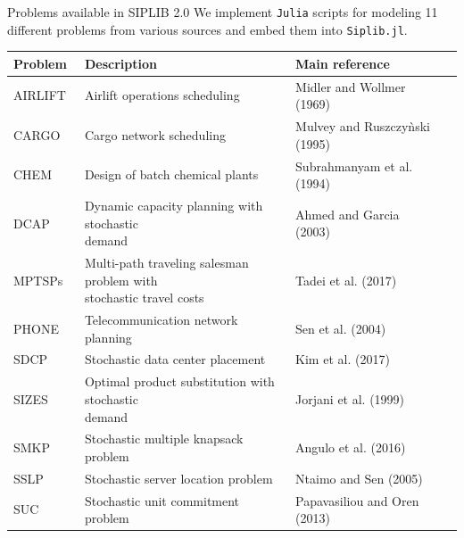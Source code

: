 \documentclass{beamer}
\def\ttiny{\fontsize{6pt}{6pt}\selectfont}
\newcommand{\siplibtwo}{\textsf{SIPLIB 2.0}}
\newcommand{\airlift}{\textsf{AIRLIFT}}
\newcommand{\chem}{\textsf{CHEM}}
\newcommand{\dcap}{\textsf{DCAP}}
\newcommand{\sdcp}{\textsf{SDCP}}
\newcommand{\mptsps}{\textsf{MPTSPs}}
\newcommand{\sizes}{\textsf{SIZES}}
\newcommand{\smkp}{\textsf{SMKP}}
\newcommand{\sslp}{\textsf{SSLP}}
\newcommand{\suc}{\textsf{SUC}}
\newcommand{\cargo}{\textsf{CARGO}}
\newcommand{\phone}{\textsf{PHONE}}
\newcommand{\siplibjl}{\texttt{Siplib.jl}}
\begin{document}
	\begin{frame}{Problems available in \siplibtwo}
		We implement \texttt{Julia} scripts for modeling 11 different problems from various sources and embed them into \siplibjl.
		\ttiny
		\begin{table}[H]
			\centering
			\label{table:problems}
			\begin{tabular}{@{}llll@{}}
				\toprule
				Problem		  		  & Description                                                        & Main reference              \\ \midrule
				\airlift\ & Airlift operations scheduling & Midler and Wollmer (1969)  \\
				\cargo\ & Cargo network scheduling  & Mulvey and Ruszczy\`{n}ski (1995) \\
				\chem\ & Design of batch chemical plants& Subrahmanyam et al. (1994) \\				
				\dcap\         & \makecell[tl]{Dynamic capacity planning with stochastic\\ demand  }                  & Ahmed and Garcia (2003)                           \\
				\mptsps\       & \makecell[tl]{Multi-path traveling salesman problem with\\ stochastic travel costs } & Tadei et al. (2017)                             \\
				\phone\       & Telecommunication network planning & Sen et al. (2004)                            \\
				\sdcp\ 	& Stochastic data center placement  & Kim et al. (2017) \\
				\sizes\        & \makecell[tl]{Optimal product substitution with stochastic\\ demand}         & Jorjani et al. (1999)        \\
				\smkp\		  & Stochastic multiple knapsack problem                               & Angulo et al. (2016)                           \\
				\sslp\         & Stochastic server location problem                                 & Ntaimo and Sen (2005)                           \\
				\suc\         & Stochastic unit commitment problem			               & Papavasiliou and Oren (2013)                        \\ \bottomrule
			\end{tabular}%
		\end{table}
	\end{frame}
\end{document}
